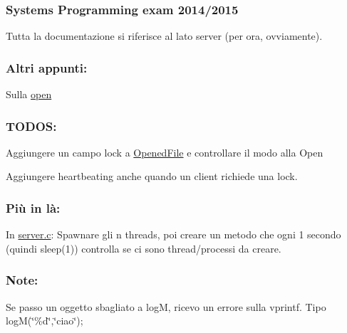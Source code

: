 \subsubsection*{Systems Programming exam 2014/2015}

Tutta la documentazione si riferisce al lato server (per ora, ovviamente). \subsubsection*{Altri appunti\+:}


\begin{DoxyItemize}
\item Sulla \hyperlink{md_OPE}{open}
\end{DoxyItemize}

\subsubsection*{T\+O\+D\+O\+S\+:}


\begin{DoxyItemize}
\item Aggiungere un campo lock a \hyperlink{structOpenedFile}{Opened\+File} e controllare il modo alla Open
\item Aggiungere heartbeating anche quando un client richiede una lock.
\end{DoxyItemize}

\subsubsection*{Più in là\+:}


\begin{DoxyItemize}
\item In \hyperlink{server_8c}{server.\+c}\+: Spawnare gli n threads, poi creare un metodo che ogni 1 secondo (quindi sleep(1)) controlla se ci sono thread/processi da creare.
\end{DoxyItemize}

\subsubsection*{Note\+:}


\begin{DoxyItemize}
\item Se passo un oggetto sbagliato a log\+M, ricevo un errore sulla vprintf. Tipo log\+M(\char`\"{}\%d\char`\"{},\char`\"{}ciao\char`\"{}); 
\end{DoxyItemize}